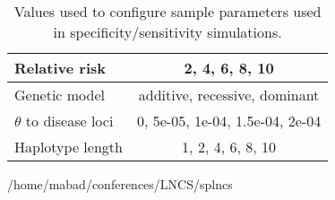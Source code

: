 \documentclass[runningheads]{/home/mabad/conferences/LNCS/llncs}
\begin{document}
\begin{table}[hb] 
\centering 

\caption{Values used to configure sample parameters used in specificity/sensitivity simulations.}
\begin{tabular}{|l|c|}
\hline
Relative risk & 2, 4, 6, 8, 10 \\
\hline
Genetic model & additive, recessive, dominant \\
\hline
$\theta$ to disease loci & 0, 5e-05,  1e-04, 1.5e-04, 2e-04\\
\hline
Haplotype length & 1, 2, 4, 6, 8, 10 \\
\hline
\end{tabular}
\label  {tab:Sconfigurations}
\end{table} 



 {/home/mabad/conferences/LNCS/splncs}  %

\end{document}
